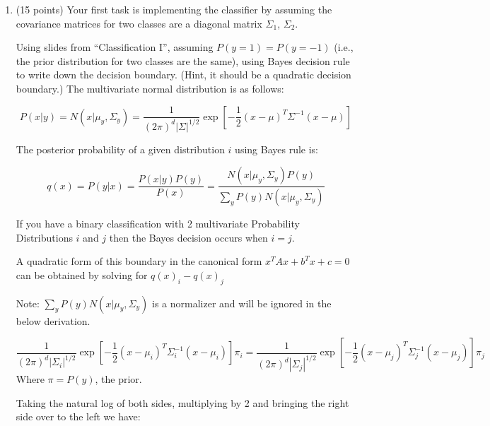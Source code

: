 \documentclass[a4paper,12pt,fleqn]{article}
\begin{document}
\begin{enumerate}
\item (15 points)
Your first task is implementing the classifier by assuming the covariance matrices for two classes are a diagonal matrix $\Sigma_1$, $\Sigma_ 2$. 

Using slides from ``Classification I'', assuming $P(y=1) = P(y=-1)$ (i.e., the prior distribution for two classes are the same), using Bayes decision rule to write down the decision boundary. (Hint, it should be a quadratic decision boundary.)
\vspace{.15in}
The multivariate normal distribution is as follows:

$$
P(x|y) = N(x|\mu_y,\Sigma_y) = \frac{1}{(2\pi)^{d}|\Sigma|^{1/2}}\exp[-\frac{1}{2}(x-\mu)^T\Sigma^{-1}(x-\mu)]
$$

The posterior probability of a given distribution $i$ using Bayes rule is:

$$
q(x) = P(y|x) = \frac{P(x|y)P(y)}{P(x)} = \frac{N(x|\mu_y,\Sigma_y)P(y)}{\sum_yP(y)N(x|\mu_y,\Sigma_y)}
$$



If you have a binary classification with 2 multivariate Probability Distributions $i$ and $j$ then the Bayes decision occurs when $i =j$.

A quadratic form of this boundary in the canonical form $x^TAx+b^Tx+c=0$ can be obtained by solving for $q(x)_i - q(x)_j$

Note: $\sum_yP(y)N(x|\mu_y,\Sigma_y)$ is a normalizer and will be ignored in the below derivation.


$$
\frac{1}{(2\pi)^{d}|\Sigma_i|^{1/2}}\exp[-\frac{1}{2}(x-\mu_i)^T\Sigma^{-1}_i(x-\mu_i)]\pi_i 
= 
\frac{1}{(2\pi)^{d}|\Sigma_j|^{1/2}}\exp[-\frac{1}{2}(x-\mu_j)^T\Sigma^{-1}_j(x-\mu_j)]\pi_j
$$
Where $\pi = P(y)$, the prior.

Taking the natural log of both sides, multiplying by 2 and bringing the right side over to the left we have:


\end{enumerate}
\end{document}
